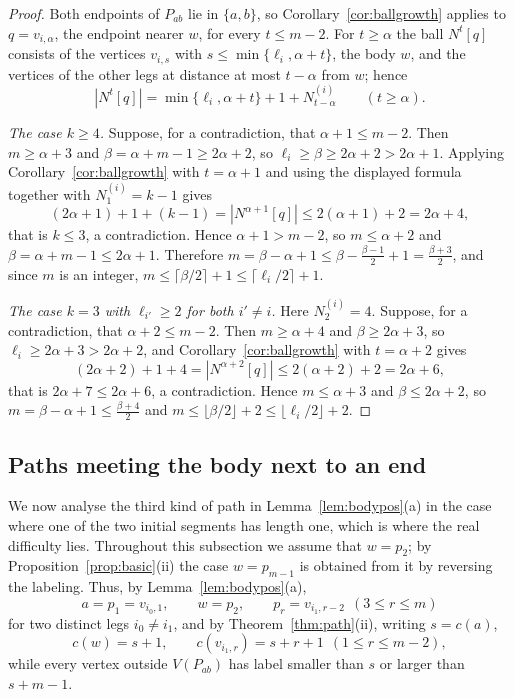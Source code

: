 \documentclass[reqno,10pt]{article}
\theoremstyle{definition}
\numberwithin{equation}{section}
\numberwithin{theorem}{section}
\newcommand{\Ball}[2]{N^{#2}[#1]}
\begin{document}
\begin{proof}
Both endpoints of $P_{ab}$ lie in $\{a,b\}$, so
Corollary~\ref{cor:ballgrowth} applies to $q=v_{i,\alpha}$, the endpoint nearer
$w$, for every $t\le m-2$. For $t\ge\alpha$ the ball $\Ball{q}{t}$ consists of
the vertices $v_{i,s}$ with $s\le\min\{\ell_i,\alpha+t\}$, the body $w$, and the
vertices of the other legs at distance at most $t-\alpha$ from $w$; hence
\[
  |\Ball{q}{t}|=\min\{\ell_i,\alpha+t\}+1+N^{(i)}_{t-\alpha}
  \qquad (t\ge\alpha).
\]

\smallskip
\noindent\emph{The case $k\ge4$.}
Suppose, for a contradiction, that $\alpha+1\le m-2$. Then $m\ge\alpha+3$ and
$\beta=\alpha+m-1\ge2\alpha+2$, so $\ell_i\ge\beta\ge2\alpha+2>2\alpha+1$.
Applying Corollary~\ref{cor:ballgrowth} with $t=\alpha+1$ and using the displayed
formula together with $N^{(i)}_1=k-1$ gives
\[
  (2\alpha+1)+1+(k-1)=|\Ball{q}{\alpha+1}|\le 2(\alpha+1)+2=2\alpha+4 ,
\]
that is $k\le3$, a contradiction. Hence $\alpha+1>m-2$, so $m\le\alpha+2$ and
$\beta=\alpha+m-1\le2\alpha+1$. Therefore
$m=\beta-\alpha+1\le\beta-\tfrac{\beta-1}{2}+1=\tfrac{\beta+3}{2}$, and since
$m$ is an integer, $m\le\lceil\beta/2\rceil+1\le\lceil\ell_i/2\rceil+1$.

\smallskip
\noindent\emph{The case $k=3$ with $\ell_{i'}\ge2$ for both $i'\ne i$.}
Here $N^{(i)}_2=4$. Suppose, for a contradiction, that $\alpha+2\le m-2$.
Then $m\ge\alpha+4$ and $\beta\ge2\alpha+3$, so $\ell_i\ge2\alpha+3>2\alpha+2$,
and Corollary~\ref{cor:ballgrowth} with $t=\alpha+2$ gives
\[
  (2\alpha+2)+1+4=|\Ball{q}{\alpha+2}|\le2(\alpha+2)+2=2\alpha+6 ,
\]
that is $2\alpha+7\le2\alpha+6$, a contradiction. Hence $m\le\alpha+3$ and
$\beta\le2\alpha+2$, so $m=\beta-\alpha+1\le\tfrac{\beta+4}{2}$ and
$m\le\lfloor\beta/2\rfloor+2\le\lfloor\ell_i/2\rfloor+2$.
\end{proof}

\subsection{Paths meeting the body next to an end}

We now analyse the third kind of path in Lemma~\ref{lem:bodypos}(a) in the case
where one of the two initial segments has length one, which is where the real
difficulty lies. Throughout this subsection we assume that $w=p_2$; by
Proposition~\ref{prop:basic}(ii) the case $w=p_{m-1}$ is obtained from it by
reversing the labeling. Thus, by Lemma~\ref{lem:bodypos}(a),
\begin{equation}
  a=p_1=v_{i_0,1},\qquad w=p_2,\qquad p_{r}=v_{i_1,r-2}\ \ (3\le r\le m)
  \label{eq:B2}
\end{equation}
for two distinct legs $i_0\ne i_1$, and by Theorem~\ref{thm:path}(ii), writing
$s=c(a)$,
\begin{equation}
  c(w)=s+1,\qquad c(v_{i_1,r})=s+r+1\ \ (1\le r\le m-2),
  \label{eq:B2labels}
\end{equation}
while every vertex outside $V(P_{ab})$ has label smaller than $s$ or larger
than $s+m-1$.
\end{document}
